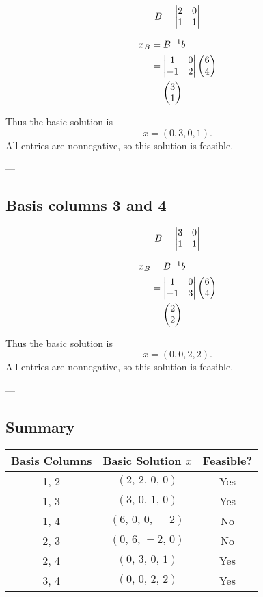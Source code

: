 \[
	B = \m{v}{2&0\\1&1}
\]

\begin{align*}
	x_B &= B^{-1}b \\
	&= \m{v}{1&0\\-1&2} \m{p}{6\\4} \\
	&= \m{p}{3\\1}
\end{align*}

Thus the basic solution is
\[
	x = (0, 3, 0, 1).
\]
All entries are nonnegative, so this solution is feasible.

---

\subsection*{Basis columns 3 and 4}

\[
	B = \m{v}{3&0\\1&1}
\]

\begin{align*}
	x_B &= B^{-1}b \\
	&= \m{v}{1&0\\-1&3} \m{p}{6\\4} \\
	&= \m{p}{2\\2}
\end{align*}

Thus the basic solution is
\[
	x = (0, 0, 2, 2).
\]
All entries are nonnegative, so this solution is feasible.

---

\subsection*{Summary}

\begin{center}
\begin{tabular}{c|c|c}
\textbf{Basis Columns} & \textbf{Basic Solution $x$} & \textbf{Feasible?} \\
\hline
1, 2 & $(2,\,2,\,0,\,0)$ & Yes \\
1, 3 & $(3,\,0,\,1,\,0)$ & Yes \\
1, 4 & $(6,\,0,\,0,\,-2)$ & No \\
2, 3 & $(0,\,6,\,-2,\,0)$ & No \\
2, 4 & $(0,\,3,\,0,\,1)$ & Yes \\
3, 4 & $(0,\,0,\,2,\,2)$ & Yes \\
\end{tabular}
\end{center}
